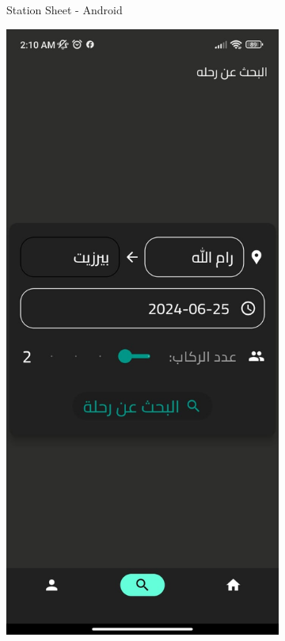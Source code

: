 \documentclass[a4paper, 12pt]{report} %
\begin{document}
\begin{figure}[H]
\begin{subfigure}{0.31\textwidth}
                    \caption{Station Sheet - Android}
                    \label{fig:trip_search_1}
                \end{subfigure}
                \begin{subfigure}{0.31\textwidth}
                    \includegraphics[width=\linewidth]{Images/trip_search_2.jpg}

\end{subfigure}
\end{figure}
\end{document}

